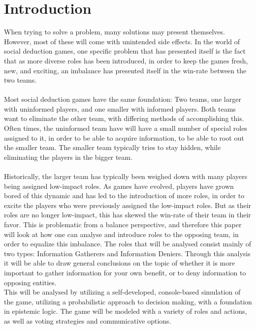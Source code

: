 \section{Introduction}
When trying to solve a problem, many solutions may present themselves. However,
most of these will come with unintended side effects. In the world of social
deduction games, one specific problem that has presented itself is the fact
that as more diverse roles has been introduced, in order to keep the games
fresh, new, and exciting, an imbalance has presented itself in the win-rate
between the two teams. \\ \\ Most social deduction games have the same
foundation: Two teams, one larger with uninformed players, and one smaller with
informed players. Both teams want to eliminate the other team, with differing
methods of accomplishing this. Often times, the uninformed team have will have
a small number of special roles assigned to it, in order to be able to acquire
information, to be able to root out the smaller team. The smaller team
typically tries to stay hidden, while eliminating the players in the bigger
team.\\ \\ Historically, the larger team has typically been weighed down with
many players being assigned low-impact roles. As games have evolved, players
have grown bored of this dynamic and has led to the introduction of more roles,
in order to excite the players who were previously assigned the low-impact
roles. But as their roles are no longer low-impact, this has skewed the
win-rate of their team in their favor. This is problematic from a balance
perspective, and therefore this paper will look at how one can analyse and
introduce roles to the opposing team, in order to equalize this imbalance. The
roles that will be analysed consist mainly of two types: Information Gatherers
and Information Deniers. Through this analysis it will be able to draw general
conclusions on the topic of whether it is more important to gather information
for your own benefit, or to deny information to opposing entities. \\

This will be analysed by utilizing a self-developed, console-based simulation
of the game, utilizing a probabilistic approach to decision making, with a
foundation in epistemic logic. The game will be modeled with a variety of roles
and actions, as well as voting strategies and communicative options.

